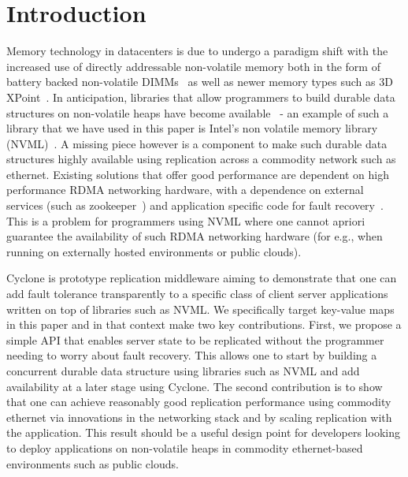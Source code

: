 \documentclass[letterpaper,twocolumn,10pt]{article}
\begin{document}
\section{Introduction}
Memory technology in datacenters is due to undergo a paradigm shift with the
increased use of directly addressable non-volatile memory both in the form of
battery backed non-volatile DIMMs~\cite{farm} as well as newer memory types such
as 3D XPoint~\cite{pmfs, bpfs}. In anticipation, libraries that allow
programmers to build durable data structures on non-volatile heaps have become
available~\cite{mnemosyne, nvheaps, cdds} - an example of such a library that we
have used in this paper is Intel's non volatile memory library
(NVML)~\cite{nvml}. A missing piece however is a component to make such durable
data structures highly available using replication across a commodity network
such as ethernet. Existing solutions that offer good performance are dependent
on high performance RDMA networking hardware, with a dependence on external
services (such as zookeeper~\cite{zookeeper}) and application specific code for
fault recovery~\cite{farm, htm}.  This is a problem for programmers using NVML
where one cannot apriori guarantee the availability of such RDMA networking
hardware (for e.g., when running on externally hosted environments or public
clouds).

Cyclone is prototype replication middleware aiming to demonstrate that one
can add fault tolerance transparently to a specific class of client server
applications written on top of libraries such as NVML. We specifically target
key-value maps in this paper and in that context make two key
contributions. First, we propose a simple API that enables server state to be
replicated without the programmer needing to worry about fault recovery. This
allows one to start by building a concurrent durable data structure using
libraries such as NVML and add availability at a later stage using Cyclone. The
second contribution is to show that one can achieve reasonably good replication 
performance using commodity ethernet via innovations in the networking stack and
by scaling replication with the application. This result should be a useful
design point for developers looking to deploy applications on non-volatile heaps
in commodity ethernet-based environments such as public clouds.
\end{document}
